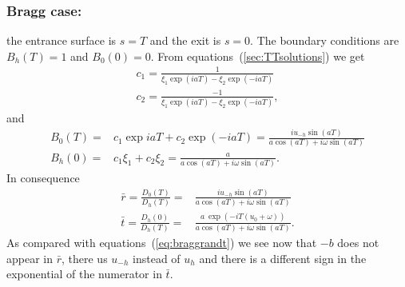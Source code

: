 \documentclass[preprint]{iucr}              %
\begin{document}
\subsubsection{Bragg case:} the entrance surface is $s=T$ and the exit is $s=0$. The boundary conditions are $B_h(T)=1$ and $B_0(0)=0$. From equations~(\ref{sec:TTsolutions}) we get
\begin{subequations}
\begin{align}
c_1 = \frac{1}{\xi_1 \exp(i a T) - \xi_2 \exp(-i a T)}\\
c_2 = \frac{-1}{\xi_1 \exp(i a T) - \xi_2 \exp(-i a T)},
\end{align}
\end{subequations}
and 
\begin{subequations}
\begin{align}
B_0(T) = &c_1 \exp{i a T} + c_2 \exp(-i a T)=
\frac{i u_{-h} \sin(a T)}{a \cos(a T)+ i \omega \sin(a T)}\\
B_h(0) = &c_1 \xi_1 + c_2 \xi_2=
\frac{a}{a \cos(a T)+ i \omega \sin(a T)}.
\end{align}
\end{subequations}
In consequence
\begin{subequations}
\label{eq:braggrbarandtbar}
\begin{align}
\bar r = \frac{D_0(T)}{D_h(T)} = &
\frac{i u_{-h} \sin(a T)}{a \cos(a T)+ i \omega \sin(a T)}\\
\bar t = \frac{D_h(0)}{D_h(T)} = &
\frac{a ~ \exp(-i T (u_0+\omega))}{a \cos(a T)+ i \omega \sin(a T)} .
\end{align}
\end{subequations}
As compared with equations~(\ref{eq:braggrandt}) we see now that $-b$ does not appear in $\bar r$, there us $u_{-h}$ instead of $u_h$ and there is a different sign in the exponential of the numerator in $\bar t$. 







\end{document}
